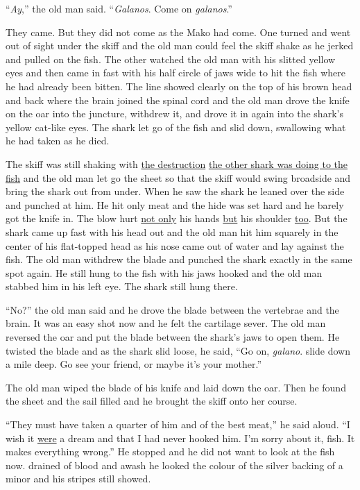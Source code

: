 ``\emph{Ay},'' the old man said. ``\emph{Galanos}. Come on \emph{galanos}.''

They came. But they did not come as the Mako had come. One turned and went
out of sight under the skiff and the old man could feel the skiff \gls{shake} as
he jerked and pulled on the fish. The other watched the old man with his
\gls{slitted} yellow eyes and then came in fast with his half circle of jaws
wide to hit the fish where he had already been \gls{bitten}. The line showed
clearly on the top of his brown head and back where the brain joined the
\gls{spinal} cord and the old man drove the knife on the oar into the
\gls{juncture}, \gls{withdrew} it, and drove it in again into the shark's yellow
cat-like eyes. The shark let go of the fish and slid down, swallowing what
he had taken as he died.

The skiff was still shaking with \uline{the destruction} \uline{the other
  shark was doing to the fish} and the old man let go the sheet so that the
skiff would \gls{swing} \gls{broadside} and bring the shark out from under.
When he saw the shark he leaned over the side and \gls{punched} at him. He
hit only meat and the hide was set hard and he \gls{barely} got the knife
in. The blow hurt \uline{not only} his hands \uline{but} his shoulder
\uline{too}. But the shark came up fast with his head out and the old man
hit him \gls{squarely} in the center of his flat-topped head as his nose
came out of water and lay against the fish. The old man withdrew the blade
and punched the shark exactly in the same spot again. He still hung to the
fish with his jaws hooked and the old man \gls{stabbed} him in his left eye.
The shark still hung there.

``No?'' the old man said and he drove the blade between the \gls{vertebrae}
and the brain. It was an easy shot now and he felt the \gls{cartilage}
\gls{sever}. The old man \gls{reversed} the oar and put the blade between the
shark's jaws to open them. He \gls{twisted} the blade and as the shark slid
loose, he said, ``Go on, \emph{galano}. \Gls{slide} down a mile deep. Go see your friend,
or maybe it's your mother.''

The old man wiped the blade of his knife and laid down the oar. Then he
found the sheet and the sail filled and he brought the skiff onto her
course.

``They must have taken a quarter of him and of the best meat,'' he said
aloud. ``I wish it \uline{were} a dream and that I had never hooked him.
I'm sorry about it, fish. It makes everything wrong.'' He stopped and he did
not want to look at the fish now. \Gls{drained} of blood and \gls{awash} he
looked the colour of the silver backing of a minor and his stripes still
showed.

